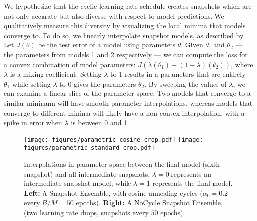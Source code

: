  We hypothesize that the cyclic learning rate schedule creates snapshots which are not only accurate but also diverse with respect to model predictions. We qualitatively measure this diversity by visualizing the local minima that models converge to.
To do so, we linearly interpolate snapshot models, as described by~\cite{goodfellow2014qualitatively}.
Let $J \left(\theta\right)$ be the test error of a model using parameters $\theta$.
Given $\theta_1$ and $\theta_2$ --- the parameters from models 1 and 2 respectively --- we can compute the loss for a convex combination of model parameters: $J \left( \lambda \left( \theta_1 \right) + \left(1 - \lambda \right) \left( \theta_2 \right) \right)$,
where $\lambda$ is a mixing coefficient. Setting $\lambda$ to 1 results in a parameters that are entirely $\theta_1$ while setting $\lambda$ to 0 gives the parameters $\theta_2$. By sweeping the values of $\lambda$,
we can examine a linear slice of the parameter space. Two models that  converge to a similar minimum will have smooth parameter interpolations, whereas models that converge to different minima will likely have a non-convex interpolation, with a spike in error when $\lambda$  is between 0 and 1.

 \begin{figure*}[t]
        \centerline{\texttt{[image: figures/parametric\_cosine-crop.pdf]}
        \texttt{[image: figures/parametric\_standard-crop.pdf]}
        }
        \caption[]
        {\small Interpolations in parameter space between the final model (sixth snapshot) and all intermediate snapshots. $\lambda=0$ represents an intermediate snapshot model, while $\lambda=1$ represents the final model.
        {\bf Left:} A Snapshot Ensemble, with cosine annealing cycles ($\alpha_0=0.2$ every $B/M=50$ epochs).
        {\bf Right:} A NoCycle Snapshot Ensemble, (two learning rate drops, snapshots every $50$ epochs).
        }
        \label{fig:parametric-plots}
        \vspace{-1em}
    \end{figure*}

